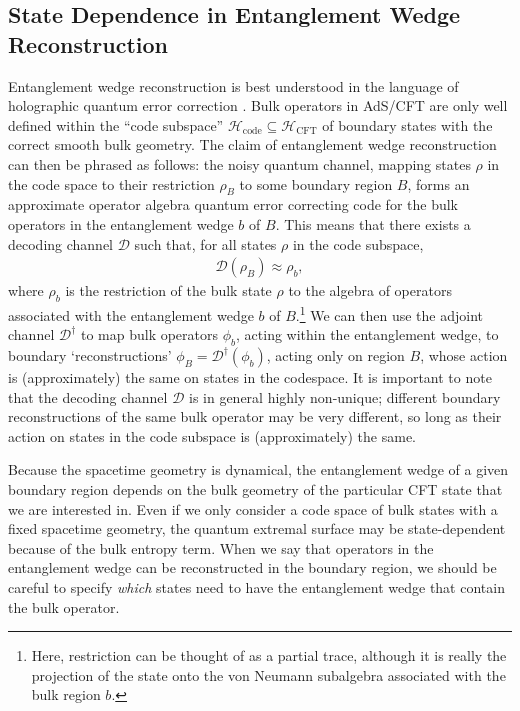 \documentclass[11pt,a4paper]{article}
\begin{document}
\subsection{State Dependence in Entanglement Wedge Reconstruction} \label{sec:abits}
Entanglement wedge reconstruction is best understood in the language of holographic quantum error correction \cite{almheiri2015bulk}. Bulk operators in AdS/CFT are only well defined within the ``code subspace'' $\mathcal{H}_{\text{code}} \subseteq \mathcal{H}_\text{CFT}$ of boundary states with the correct smooth bulk geometry. The claim of entanglement wedge reconstruction can then be phrased as follows:  the noisy quantum channel, mapping states $\rho$ in the code space to their restriction $\rho_B$ to some boundary region $B$, forms an approximate operator algebra quantum error correcting code for the bulk operators in the entanglement wedge $b$ of $B$. This means that there exists a decoding channel $\mathcal{D}$ such that, for all states $\rho$ in the code subspace,
\begin{align}
\mathcal{D} (\rho_B) \approx \rho_b,
\end{align}
where $\rho_b$ is the restriction of the bulk state $\rho$ to the algebra of operators associated with the entanglement wedge $b$ of $B$.\footnote{Here, restriction can be thought of as a partial trace, although it is really the projection of the state onto the von Neumann subalgebra associated with the bulk region $b$.} We can then use the adjoint channel $\mathcal{D}^\dagger$ to map bulk operators $\phi_b$, acting within the entanglement wedge, to boundary `reconstructions' $\phi_B = \mathcal{D}^\dagger (\phi_b)$, acting only on region $B$, whose action is (approximately) the same on states in the codespace. It is important to note that the decoding channel $\mathcal{D}$ is in general highly non-unique; different boundary reconstructions of the same bulk operator may be very different, so long as their action on states in the code subspace is (approximately) the same.

Because the spacetime geometry is dynamical, the entanglement wedge of a given boundary region depends on the bulk geometry of the particular CFT state that we are interested in. Even if we only consider a code space of bulk states with a fixed spacetime geometry, the quantum extremal surface may be state-dependent because of the bulk entropy term. When we say that operators in the entanglement wedge can be reconstructed in the boundary region, we should be careful to specify \emph{which} states need to have the entanglement wedge that contain the bulk operator.
\end{document}
